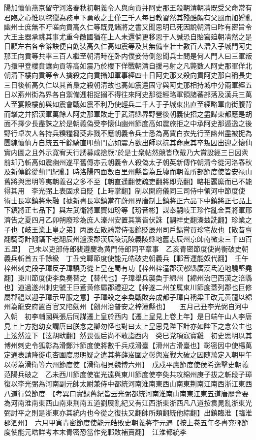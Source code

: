 陽加懷仙燕京留守河洛春秋初朝義令人與向貢并阿史那王殺朝清朝凊既受父命常有君臨之心惟以毬獵為務車下勇敢之士僅三千人每日教習然其殘酷頗有父風而加婬亂幽州士庶無不吁嗟向貢高久仁等既見諸將之書又聞思明已死因說朝清曰昨有密旨令大王主器承祧其事尤重今敵國猶在上人未還倘更移恩于人誠恐自貽窘廹朝凊然之是日顧左右各令辭訣便自飭装高久仁高如震等及其無備率壯士數百人濳入子城門阿史那王向貢等共率三百人繼至朝清時在卧内僕妾侍側忽聞兵士問是何人門人曰三軍叛乃擐甲登樓賁讓向貢等高如震乃於樓下佯戰朝清自援弓射之凡斃數人阿史那軍佯北朝清下樓向貢等令人擒殺之向貢攝知軍事經四十日阿史那又殺向貢阿史那自稱長史三日後斬高久仁以其首梟之殺朝清故也高如震還固守與阿史那相持城中分兩軍經五日以燕州街為界各自禦備逓相捉搦不得往來阿史那從經略軍領諸蕃部落及漢兵三萬人至宴設樓前與如震會戰如震不利乃使輕兵二千人于子城東出直至經略軍南街腹背而擊之并招漢軍萬餘人阿史那軍敗走于武清縣界野營後朝義使招之盡歸東都應是胡面不擇少長盡誅之於是朝義偽受李懷仙幽州節度高如震旅拒之中承阿史那遁逸之後野行卓次人各持兵糗糧芻茭非戮不應朝義令兵士悉為高賈白衣先行至幽州盡被捉為團練懷仙方自統五千餘騎直叩薊門高如震方欲出師以抗其命慮其卒叛因出迎之懷仙實内圖之且外示寛宥天行誘募咸捨厥?於是士衆帖然競皆欣戴乃大賞設經三日因衆前却乃斬高如震幽州遂平舊傳亦云朝義令人殺偽太子朝英新傳作朝清今從河洛春秋及新傳餘從薊門紀亂】時洛陽四面數百里州縣皆為丘墟而朝義所部節度使皆安禄山舊將與思明等夷朝義召之多不至【朝直遥翻使疏吏翻將即亮翻】略相覊縻而已不能得其用　李光弼上表固求自貶【上時掌翻】制以開府儀同三司侍中領河中節度使　術士長塞鎮將朱融【據新書長塞鎮當在蔚州界唐制上鎮將正六品下中鎮將正七品上下鎮將正七品下】與左武衛將軍竇如玢等【玢音彬】謀奉嗣岐王珍作亂金吾將軍邢濟告之夏四月乙卯朔廢珍為庶人溱州安置其黨皆伏誅【嗣祥史翻溱兹詵翻】珍業之子也【岐王業上皇之弟】丙辰左散騎常侍張鎬貶辰州司戶鎬嘗買珍宅故也【散昔亶翻騎奇計翻鎬下老翻辰州瀘溪郡漢辰陵沅陵義陵縣地舊志辰州京師南微東三千四百五里】　己未以吏部侍郎裴遵慶為黄門侍郎同平章事　乙亥青密節度使尚衡破史朝義兵斬首五千餘級　丁丑兖鄆節度使能元皓破史朝義兵【鄆音運能奴代翻】　壬午梓州刺史段子璋反子璋驍勇從上皇在蜀有功【梓州梓潼郡漢鄠縣廣漢氐道地驍堅堯翻】東川節度使李奐奏替之【替代也】子璋舉兵襲奐于綿州【綿州治巴西漢之涪縣也】道過遂州刺史虢王巨蒼黄修屬郡禮迎之【梓遂二州並属東川節度蓋列郡也巨修屬郡禮以迎子璋示卑服之意】子璋殺之李奐戰敗奔成都子璋自稱梁王改元黄龍以綿州為龍安府置百官又陷劒州【劒州治普安之梓潼縣也】　　五月己丑李光弼自河中入朝　初李輔國與張后同謀遷上皇於西内【遷上皇見上卷上年】是日端午山人李唐見上上方抱幼女謂唐曰朕念之卿勿怪也對曰太上皇思見陛下計亦如陛下之念公主也上泫然泣下【泫胡畎翻】然畏張后尚不敢詣西内　癸巳党項寇寶雞　初史思明以其博州刺史令狐彰為滑鄭汴節度使將數千兵戍滑臺【滑州古滑臺也】彰密因中使楊萬定通表請降徙屯杏園度思明疑之遣其將薛岌圍之彰與岌戰大破之因随萬定入朝甲午以彰為滑衛等六州節度使【滑衛相貝魏博六州】　戊戍平盧節度使侯希逸擊史朝義范陽兵破之　乙未西川節度使崔光遠與東川節度使李奐共攻綿州庚子拔之斬段子璋　復以李光弼為河南副元帥太尉兼侍中都統河南淮南東西山南東荆南江南西浙江東西八道行營節度　【考異曰實録舊紀皆云光弼都統河南淮南山南東江東五道唐歷會要為河南淮南東西山南東荆南五道劉展亂紀又有江西浙東浙西凡八道按袁晁亂浙東光弼討平之則是浙東亦其統内也今從之復扶又翻帥所類翻統他綜翻】出鎮臨淮【臨淮郡泗州】　六月甲寅青密節度使能元皓敗史朝義將李元遇【按上卷五年冬書兖鄆節度使能元皓詳考本末青密恐當作兖鄆敗補賣翻】　江淮都統李